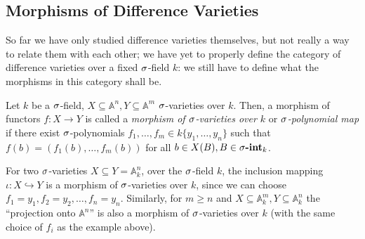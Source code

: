 \subsection{Morphisms of Difference Varieties}

So far we have only studied difference varieties themselves, but not really a way to relate them with each other; we have yet to properly define the category of difference varieties over a fixed $\sigma$-field $k$: 
we still have to define what the morphisms in this category shall be.

\begin{defn}\label{spolynomialmaps}
Let $k$ be a $\sigma$-field, $X \subseteq \mathbb{A}^n,Y \subseteq \mathbb{A}^m$ $\sigma$-varieties over $k$. Then, a morphism of functors $f: X \rightarrow Y$ is called a \emph{morphism of $\sigma$-varieties over $k$} or \emph{$\sigma$-polynomial map} if 
there exist $\sigma$-polynomials $f_1,\ldots,f_m \in k\{y_1,\ldots,y_n\}$ such that $f(b) = (f_1(b),\ldots,f_m(b))$ for all $b \in X(B), B \in \sigma\text{{\normalfont\textbf{-int}}}_k$.  
 
\end{defn}

\begin{ex}
For two $\sigma$-varieties $X \subseteq Y = \mathbb{A}^n_k$, over the $\sigma$-field $k$, the inclusion mapping $\iota: X \hookrightarrow Y$ is a morphism of $\sigma$-varieties over $k$, since we can choose $f_1 = y_1, f_2 = y_2, \ldots, f_n = y_n$.
Similarly, for $m \geq n$ and $X \subseteq \mathbb{A}^m_k, Y \subseteq \mathbb{A}^n_k$ the ``projection onto $\mathbb{A}^n$'' is also a morphism of $\sigma$-varieties over $k$ (with the same choice of $f_i$ as the example above).
\end{ex}


